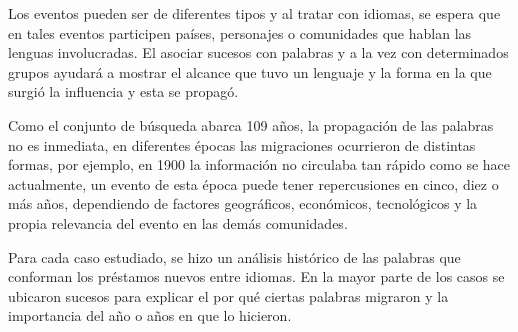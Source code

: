 Los eventos pueden ser de diferentes tipos y al tratar con idiomas, se espera
que en tales eventos participen países, personajes o  comunidades que hablan
las lenguas involucradas.  El asociar sucesos con palabras y a la vez con
determinados grupos ayudará a mostrar el alcance que tuvo un lenguaje y la
forma en la que surgió la influencia y esta se propagó. 

Como el conjunto de búsqueda abarca 109 años,  la propagación de las palabras
no es inmediata, en diferentes épocas las migraciones ocurrieron de distintas
formas,  por ejemplo, en 1900 la información no circulaba tan rápido como se
hace actualmente, un evento de esta época puede tener repercusiones en cinco,
diez o más años,  dependiendo de factores geográficos, económicos, tecnológicos
y  la  propia relevancia del evento en las demás comunidades.

Para cada caso estudiado, se hizo un análisis histórico de las palabras que
conforman los préstamos nuevos entre idiomas.  En la mayor parte de los casos
se ubicaron sucesos para explicar el por qué ciertas palabras migraron y la
importancia del año o años en que lo hicieron. 


